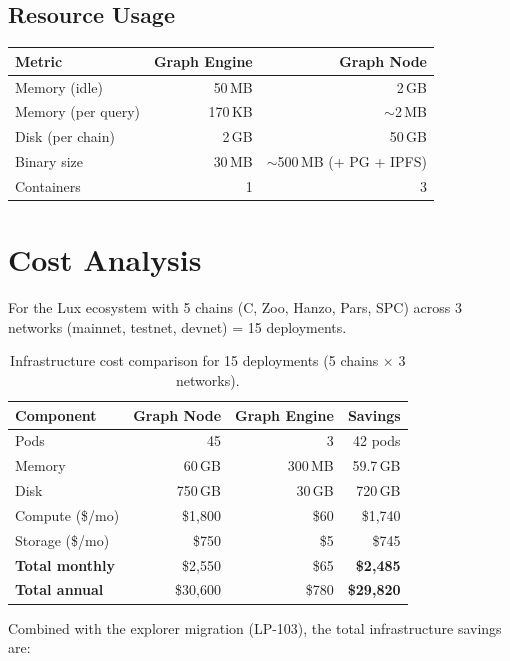 \documentclass[11pt,a4paper]{article}
\begin{document}
\subsection{Resource Usage}

\begin{table}[H]
\centering
\begin{tabular}{lrr}
\toprule
\textbf{Metric} & \textbf{Graph Engine} & \textbf{Graph Node} \\
\midrule
Memory (idle) & 50\,MB & 2\,GB \\
Memory (per query) & 170\,KB & $\sim$2\,MB \\
Disk (per chain) & 2\,GB & 50\,GB \\
Binary size & 30\,MB & $\sim$500\,MB (+ PG + IPFS) \\
Containers & 1 & 3 \\
\bottomrule
\end{tabular}
\end{table}

\section{Cost Analysis}

For the Lux ecosystem with 5 chains (C, Zoo, Hanzo, Pars, SPC) across 3 networks
(mainnet, testnet, devnet) = 15 deployments.

\begin{table}[H]
\centering
\begin{tabular}{lrrr}
\toprule
\textbf{Component} & \textbf{Graph Node} & \textbf{Graph Engine} & \textbf{Savings} \\
\midrule
Pods & 45 & 3 & 42 pods \\
Memory & 60\,GB & 300\,MB & 59.7\,GB \\
Disk & 750\,GB & 30\,GB & 720\,GB \\
Compute (\$/mo) & \$1{,}800 & \$60 & \$1{,}740 \\
Storage (\$/mo) & \$750 & \$5 & \$745 \\
\midrule
\textbf{Total monthly} & \$2{,}550 & \$65 & \textbf{\$2{,}485} \\
\textbf{Total annual} & \$30{,}600 & \$780 & \textbf{\$29{,}820} \\
\bottomrule
\end{tabular}
\caption{Infrastructure cost comparison for 15 deployments (5 chains $\times$ 3 networks).}
\end{table}

Combined with the explorer migration (LP-103), the total infrastructure savings are:
\end{document}
